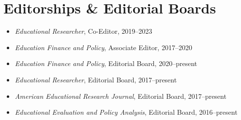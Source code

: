 \documentclass[11pt, letterpaper]{article}
\begin{document}
\section{Editorships \& Editorial Boards}
\begin{itemize}
  \item \textit{Educational Researcher}, Co-Editor, 2019--2023

  \item \textit{Education Finance and Policy}, Associate Editor, 2017--2020

  \item \textit{Education Finance and Policy}, Editorial Board, 2020--present

  \item \textit{Educational Researcher}, Editorial Board, 2017--present

  \item \textit{American Educational Research Journal}, Editorial Board, 2017--present

  \item \textit{Educational Evaluation and Policy Analysis}, Editorial Board, 2016--present

\end{itemize}

\end{document}
